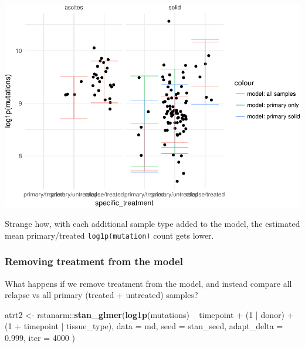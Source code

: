 \documentclass[]{article}
\newenvironment{Shaded}{\begin{snugshade}}{\end{snugshade}}
\newcommand{\KeywordTok}[1]{\textcolor[rgb]{0.13,0.29,0.53}{\textbf{{#1}}}}
\newcommand{\DataTypeTok}[1]{\textcolor[rgb]{0.13,0.29,0.53}{{#1}}}
\newcommand{\DecValTok}[1]{\textcolor[rgb]{0.00,0.00,0.81}{{#1}}}
\newcommand{\FloatTok}[1]{\textcolor[rgb]{0.00,0.00,0.81}{{#1}}}
\newcommand{\StringTok}[1]{\textcolor[rgb]{0.31,0.60,0.02}{{#1}}}
\newcommand{\NormalTok}[1]{{#1}}
\begin{document}
\includegraphics{Hierarchical_model_mutations_and_peptides_files/figure-latex/allsamp-atrt1-ppred-1.pdf}

Strange how, with each additional sample type added to the model, the
estimated mean primary/treated \texttt{log1p(mutation)} count gets
lower.

\subsubsection{Removing treatment from the
model}\label{removing-treatment-from-the-model}

What happens if we remove treatment from the model, and instead compare
all relapse vs all primary (treated + untreated) samples?

\begin{Shaded}
\begin{Highlighting}[]
\NormalTok{atrt2 <-}\StringTok{ }\NormalTok{rstanarm::}\KeywordTok{stan_glmer}\NormalTok{(}\KeywordTok{log1p}\NormalTok{(mutations) ~}\StringTok{ }
\StringTok{                                }\NormalTok{timepoint +}\StringTok{ }\NormalTok{(}\DecValTok{1} \NormalTok{|}\StringTok{ }\NormalTok{donor) +}
\StringTok{                                }\NormalTok{(}\DecValTok{1} \NormalTok{+}\StringTok{ }\NormalTok{timepoint |}\StringTok{ }\NormalTok{tissue_type),}
                              \DataTypeTok{data =} \NormalTok{md,}
                              \DataTypeTok{seed =} \NormalTok{stan_seed,}
                              \DataTypeTok{adapt_delta =} \FloatTok{0.999}\NormalTok{,}
                              \DataTypeTok{iter =} \DecValTok{4000}
                              \NormalTok{)}
\end{Highlighting}
\end{Shaded}
\end{document}
